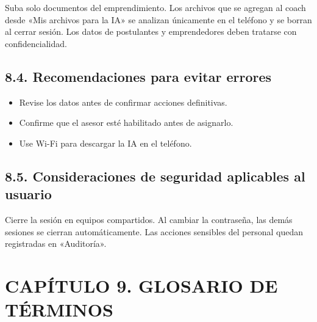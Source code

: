 \documentclass[12pt,letterpaper]{article}
\begin{document}
Suba solo documentos del emprendimiento. Los archivos que se agregan al coach desde «Mis archivos para la IA» se analizan únicamente en el teléfono y se borran al cerrar sesión. Los datos de postulantes y emprendedores deben tratarse con confidencialidad.

\subsection*{8.4. Recomendaciones para evitar errores}


\begin{itemize}
\item Revise los datos antes de confirmar acciones definitivas.
\item Confirme que el asesor esté habilitado antes de asignarlo.
\item Use Wi-Fi para descargar la IA en el teléfono.
\end{itemize}

\subsection*{8.5. Consideraciones de seguridad aplicables al usuario}


Cierre la sesión en equipos compartidos. Al cambiar la contraseña, las demás sesiones se cierran automáticamente. Las acciones sensibles del personal quedan registradas en «Auditoría».

\clearpage

\section*{CAPÍTULO 9. GLOSARIO DE TÉRMINOS}

\end{document}
